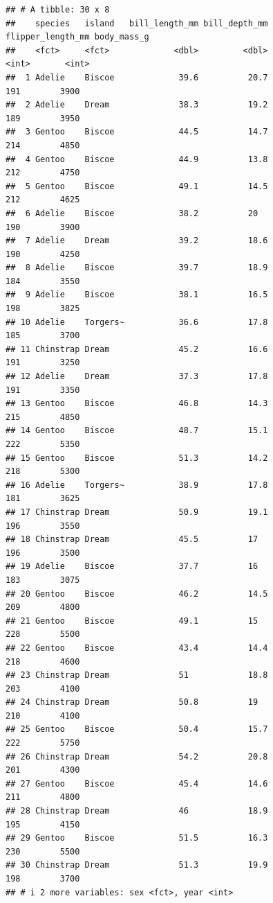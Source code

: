 \documentclass[
]{book}
\theoremstyle{definition}
\theoremstyle{definition}
\theoremstyle{definition}
\theoremstyle{definition}
\theoremstyle{remark}
\begin{document}
\begin{verbatim}
## # A tibble: 30 x 8
##    species   island   bill_length_mm bill_depth_mm flipper_length_mm body_mass_g
##    <fct>     <fct>             <dbl>         <dbl>             <int>       <int>
##  1 Adelie    Biscoe             39.6          20.7               191        3900
##  2 Adelie    Dream              38.3          19.2               189        3950
##  3 Gentoo    Biscoe             44.5          14.7               214        4850
##  4 Gentoo    Biscoe             44.9          13.8               212        4750
##  5 Gentoo    Biscoe             49.1          14.5               212        4625
##  6 Adelie    Biscoe             38.2          20                 190        3900
##  7 Adelie    Dream              39.2          18.6               190        4250
##  8 Adelie    Biscoe             39.7          18.9               184        3550
##  9 Adelie    Biscoe             38.1          16.5               198        3825
## 10 Adelie    Torgers~           36.6          17.8               185        3700
## 11 Chinstrap Dream              45.2          16.6               191        3250
## 12 Adelie    Dream              37.3          17.8               191        3350
## 13 Gentoo    Biscoe             46.8          14.3               215        4850
## 14 Gentoo    Biscoe             48.7          15.1               222        5350
## 15 Gentoo    Biscoe             51.3          14.2               218        5300
## 16 Adelie    Torgers~           38.9          17.8               181        3625
## 17 Chinstrap Dream              50.9          19.1               196        3550
## 18 Chinstrap Dream              45.5          17                 196        3500
## 19 Adelie    Biscoe             37.7          16                 183        3075
## 20 Gentoo    Biscoe             46.2          14.5               209        4800
## 21 Gentoo    Biscoe             49.1          15                 228        5500
## 22 Gentoo    Biscoe             43.4          14.4               218        4600
## 23 Chinstrap Dream              51            18.8               203        4100
## 24 Chinstrap Dream              50.8          19                 210        4100
## 25 Gentoo    Biscoe             50.4          15.7               222        5750
## 26 Chinstrap Dream              54.2          20.8               201        4300
## 27 Gentoo    Biscoe             45.4          14.6               211        4800
## 28 Chinstrap Dream              46            18.9               195        4150
## 29 Gentoo    Biscoe             51.5          16.3               230        5500
## 30 Chinstrap Dream              51.3          19.9               198        3700
## # i 2 more variables: sex <fct>, year <int>
\end{verbatim}
\end{document}
